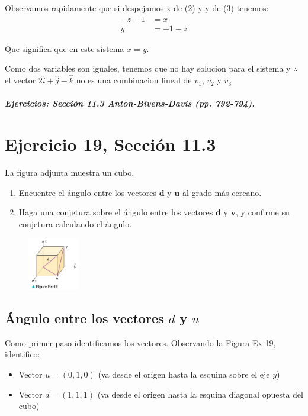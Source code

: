 \documentclass[11pt,letterpaper]{article}
\begin{document}
Observamos rapidamente que si despejamos x de (2) y y de (3) tenemos:
\begin{equation*}
    \begin{split}
        -z-1&=x\\
        y&=-1-z
    \end{split}
\end{equation*}

Que significa que en este sistema $x=y$.

Como dos variables son iguales, tenemos que no hay solucion para el sistema y $\therefore$ el vector $2\hat{i} + \hat{j} - \hat{k}$ no es una combinacion lineal de $v_1$, $v_2$ y $v_3$



\subparagraph{Ejercicios: Sección 11.3 Anton-Bivens-Davis (pp. 792-794).}

\section{Ejercicio 19, Sección 11.3}
La figura adjunta muestra un cubo.
\begin{enumerate}
    \item Encuentre el ángulo entre los vectores $\mathbf{d}$ y $\mathbf{u}$ al grado más cercano.
    \item Haga una conjetura sobre el ángulo entre los vectores $\mathbf{d}$ y $\mathbf{v}$, y confirme su conjetura calculando el ángulo.
\end{enumerate}

\begin{figure}[h]
    \centering
    \includegraphics[width=0.2\textwidth]{imagenes/Figure_Ex-19.png}
\end{figure}

\subsection*{Ángulo entre los vectores \( d \) y \( u \)}

Como primer paso identificamos los vectores.
Observando la Figura Ex-19, identifico:
\begin{itemize}
    \item Vector \( u = (0,1,0) \) (va desde el origen hasta la esquina sobre el eje \( y \))
    \item Vector \( d = (1,1,1) \) (va desde el origen hasta la esquina diagonal opuesta del cubo)
\end{itemize}
\end{document}
